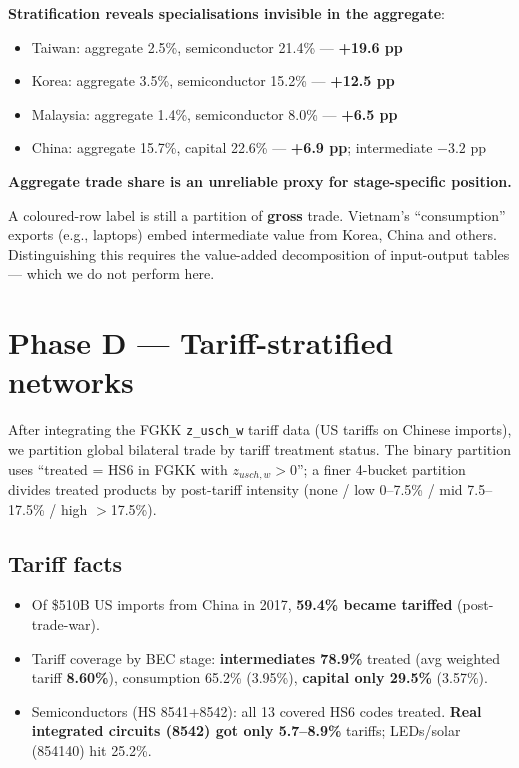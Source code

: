 \documentclass[11pt,a4paper]{article}
\begin{document}
\begin{findbox}
\textbf{Stratification reveals specialisations invisible in the aggregate}:
\begin{itemize}[leftmargin=*]
  \item Taiwan: aggregate 2.5\%, semiconductor 21.4\% — \textbf{+19.6 pp}
  \item Korea: aggregate 3.5\%, semiconductor 15.2\% — \textbf{+12.5 pp}
  \item Malaysia: aggregate 1.4\%, semiconductor 8.0\% — \textbf{+6.5 pp}
  \item China: aggregate 15.7\%, capital 22.6\% — \textbf{+6.9 pp};
        intermediate $-3.2$ pp
\end{itemize}
\textbf{Aggregate trade share is an unreliable proxy for stage-specific
position.}
\end{findbox}

\begin{limitbox}
A coloured-row label is still a partition of \textbf{gross} trade. Vietnam's
``consumption'' exports (e.g., laptops) embed intermediate value from Korea,
China and others. Distinguishing this requires the value-added decomposition
of input-output tables — which we do not perform here.
\end{limitbox}

\section{Phase D — Tariff-stratified networks}

After integrating the FGKK \texttt{z\_usch\_w} tariff data (US tariffs on
Chinese imports), we partition global bilateral trade by tariff treatment
status. The binary partition uses ``treated = HS6 in FGKK with
$z_{usch,w} > 0$''; a finer 4-bucket partition divides treated products by
post-tariff intensity (none / low 0--7.5\% / mid 7.5--17.5\% / high $>$17.5\%).

\subsection{Tariff facts}

\begin{itemize}[leftmargin=*]
  \item Of \$510B US imports from China in 2017,
        \textbf{59.4\% became tariffed} (post-trade-war).
  \item Tariff coverage by BEC stage:
        \textbf{intermediates 78.9\%} treated (avg weighted tariff
        \textbf{8.60\%}), consumption 65.2\% (3.95\%),
        \textbf{capital only 29.5\%} (3.57\%).
  \item Semiconductors (HS 8541+8542): all 13 covered HS6 codes treated.
        \textbf{Real integrated circuits (8542) got only 5.7--8.9\%}
        tariffs; LEDs/solar (854140) hit 25.2\%.
\end{itemize}
\end{document}
